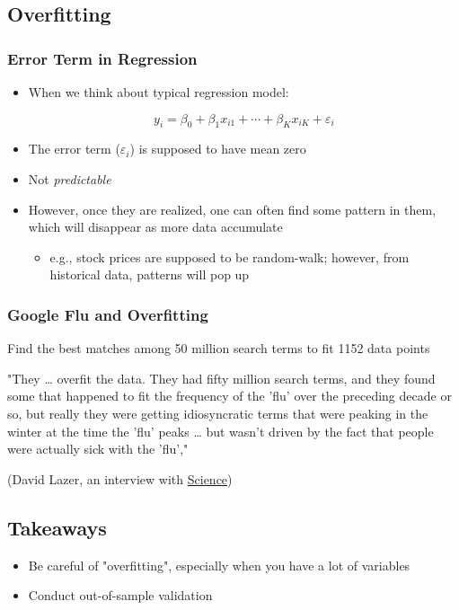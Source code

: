 \documentclass[10pt,article]{article}
\begin{document}
\subsection{Overfitting}
\label{sec:orgabcf212}
\subsubsection{Error Term in Regression}
\label{sec:orge23c055}
\begin{itemize}
\item When we think about typical regression model:

\[ y_{i} = \beta_{0} + \beta_{1}x_{i1} + \cdots + \beta_{K}x_{iK} + \varepsilon_{i} \]

\item The error term (\(\varepsilon_{i}\)) is supposed to have mean zero
\item Not \emph{predictable}
\item However, once they are realized, one can often find some pattern in them,
which will disappear as more data accumulate
\begin{itemize}
\item e.g., stock prices are supposed to be random-walk; however, from historical data, 
patterns will pop up
\end{itemize}
\end{itemize}
\subsubsection{Google Flu and Overfitting}
\label{sec:org9b99f1f}
Find the best matches among 50 million search terms to fit 1152 data points

"They \ldots{} overfit the data. They had fifty million search terms, and they
found some that happened to fit the frequency of the 'flu' over the
preceding decade or so, but really they were getting idiosyncratic terms
that were peaking in the winter at the time the 'flu' peaks \ldots{} but wasn't
driven by the fact that people were actually sick with the 'flu',"

(David Lazer, an interview with \href{http://www.sciencemag.org/content/343/6176/1270.2.full}{Science})
\subsection{Takeaways}
\label{sec:org6707529}
\begin{itemize}
\item Be careful of "overfitting", especially when you have a lot of variables
\item Conduct out-of-sample validation
\end{itemize}
\end{document}
